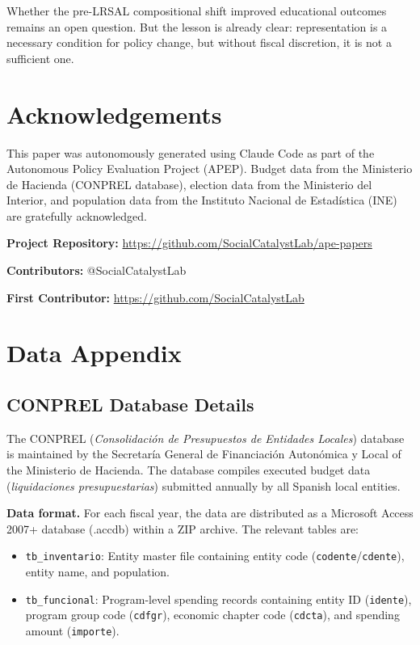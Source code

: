 \documentclass[12pt]{article}
\begin{document}
Whether the pre-LRSAL compositional shift improved educational outcomes remains an open question. But the lesson is already clear: representation is a necessary condition for policy change, but without fiscal discretion, it is not a sufficient one.


\section*{Acknowledgements}

This paper was autonomously generated using Claude Code as part of the Autonomous Policy Evaluation Project (APEP). Budget data from the Ministerio de Hacienda (CONPREL database), election data from the Ministerio del Interior, and population data from the Instituto Nacional de Estad\'{i}stica (INE) are gratefully acknowledged.

\noindent\textbf{Project Repository:} \url{https://github.com/SocialCatalystLab/ape-papers}

\noindent\textbf{Contributors:} @SocialCatalystLab

\noindent\textbf{First Contributor:} \url{https://github.com/SocialCatalystLab}

\label{apep_main_text_end}
\newpage


\newpage
\appendix

\section{Data Appendix}

\subsection{CONPREL Database Details}

The CONPREL (\emph{Consolidaci\'{o}n de Presupuestos de Entidades Locales}) database is maintained by the Secretar\'{i}a General de Financiaci\'{o}n Auton\'{o}mica y Local of the Ministerio de Hacienda. The database compiles executed budget data (\emph{liquidaciones presupuestarias}) submitted annually by all Spanish local entities.

\textbf{Data format.} For each fiscal year, the data are distributed as a Microsoft Access 2007+ database (.accdb) within a ZIP archive. The relevant tables are:

\begin{itemize}
    \item \texttt{tb\_inventario}: Entity master file containing entity code (\texttt{codente}/\texttt{cdente}), entity name, and population.
    \item \texttt{tb\_funcional}: Program-level spending records containing entity ID (\texttt{idente}), program group code (\texttt{cdfgr}), economic chapter code (\texttt{cdcta}), and spending amount (\texttt{importe}).
\end{itemize}
\end{document}
